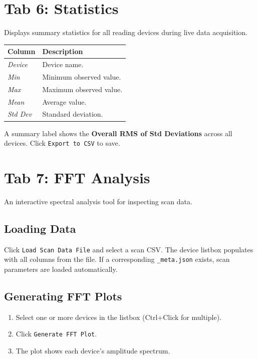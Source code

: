 \documentclass[11pt,a4paper,twoside]{report}
\newcommand{\btn}[1]{\colorbox{accent!12}{\texttt{\small #1}}}
\newcommand{\field}[1]{\textit{#1}}
\begin{document}
\section{Tab 6: Statistics}\label{sec:tab6}

Displays summary statistics for all reading devices during live data acquisition.

\begin{tabularx}{\textwidth}{lX}
  \toprule
  \textbf{Column} & \textbf{Description} \\
  \midrule
  \field{Device}  & Device name. \\
  \field{Min}     & Minimum observed value. \\
  \field{Max}     & Maximum observed value. \\
  \field{Mean}    & Average value. \\
  \field{Std Dev} & Standard deviation. \\
  \bottomrule
\end{tabularx}

A summary label shows the \textbf{Overall RMS of Std Deviations} across all devices. Click \btn{Export to CSV} to save.

\section{Tab 7: FFT Analysis}\label{sec:tab7}

An interactive spectral analysis tool for inspecting scan data.

\subsection{Loading Data}

Click \btn{Load Scan Data File} and select a scan CSV. The device listbox populates with all columns from the file. If a corresponding \texttt{\_meta.json} exists, scan parameters are loaded automatically.

\subsection{Generating FFT Plots}

\begin{enumerate}
  \item Select one or more devices in the listbox (Ctrl+Click for multiple).
  \item Click \btn{Generate FFT Plot}.
  \item The plot shows each device's amplitude spectrum.
\end{enumerate}
\end{document}
